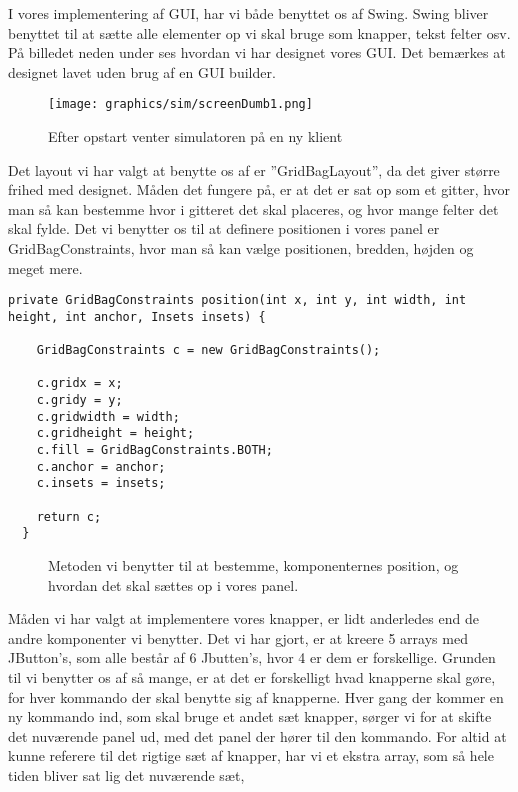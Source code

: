 \documentclass[a4paper]{article}
\newenvironment{changemargin}[2]{%
\begin{list}{}{%
\setlength{\topsep}{0pt}%
\setlength{\leftmargin}{#1}%
\setlength{\rightmargin}{#2}%
\setlength{\listparindent}{\parindent}%
\setlength{\itemindent}{\parindent}%
\setlength{\parsep}{\parskip}%
}%
\item[]}{\end{list}}
\begin{document}
I vores implementering af GUI, har vi både benyttet os af Swing. Swing bliver benyttet til at sætte alle elementer op vi skal bruge som knapper, tekst felter osv. På billedet neden under ses hvordan vi har designet vores GUI. Det bemærkes at designet lavet uden brug af en GUI builder.

\begin{figure}[H]
\begin{changemargin}{-1.3cm}{}
  \centering
  \texttt{[image: graphics/sim/screenDumb1.png]}
  \caption{Efter opstart venter simulatoren på en ny klient}
\end{changemargin}
\end{figure}

Det layout vi har valgt at benytte os af er ”GridBagLayout”, da det giver større frihed med designet. Måden det fungere på, er at det er sat op som et gitter, hvor man så kan bestemme hvor i gitteret det skal placeres, og hvor mange felter det skal fylde. Det vi benytter os til at definere positionen i vores panel er GridBagConstraints, hvor man så kan vælge positionen, bredden, højden og meget mere.

\begin{lstlisting}
private GridBagConstraints position(int x, int y, int width, int height, int anchor, Insets insets) {

    GridBagConstraints c = new GridBagConstraints();

    c.gridx = x;
    c.gridy = y;
    c.gridwidth = width;
    c.gridheight = height;
    c.fill = GridBagConstraints.BOTH;
    c.anchor = anchor;
    c.insets = insets;
    
    return c;
  } 
\end{lstlisting}
\begin{figure}[h!]
  \caption{Metoden vi benytter til at bestemme, komponenternes position, og hvordan det skal sættes op i vores panel.}
\end{figure}

Måden vi har valgt at implementere vores knapper, er lidt anderledes end de andre komponenter vi benytter. Det vi har gjort, er at kreere 5 arrays med JButton’s, som alle består af 6 Jbutten’s, hvor 4 er dem er forskellige. Grunden til vi benytter os af så mange, er at det er forskelligt hvad knapperne skal gøre, for hver kommando der skal benytte sig af knapperne. Hver gang der kommer en ny kommando ind, som skal bruge et andet sæt knapper, sørger vi for at skifte det nuværende panel ud, med det panel der hører til den kommando. For altid at kunne referere til det rigtige sæt af knapper, har vi et ekstra array, som så hele tiden bliver sat lig det nuværende sæt,
\end{document}
